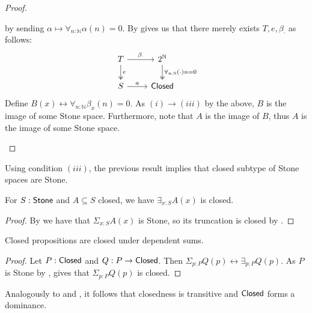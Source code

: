 \begin{proof}
\begin{itemize}
     by sending 
     $\alpha \mapsto \forall_{n:\mathbb N} \alpha (n) = 0.$
     By  gives us that there merely exists $T, e, \beta_\cdot$ as follows:
     \begin{equation}
       \begin{tikzcd}
         T \arrow[r,"\beta_\cdot"] \arrow[d, two heads,"e"] & 2^\mathbb N 
         \arrow[d,two heads, "\forall_{n:\mathbb N} (\cdot)n = 0"] \\
         S \arrow[r,"a"] & \Closed
       \end{tikzcd} 
     \end{equation} 
     Define $B(x) \leftrightarrow \forall_{n:\mathbb N} \beta_x(n) = 0$. 
     As $(i) \to (iii)$ by the above, $B$ is the image of some Stone space. 
     Furthermore, note that $A$ is the image of $B$, 
     thus $A$ is the image of some Stone space. 
\end{itemize} 
\end{proof} 

\begin{remark}\label{ClosedInStoneIsStone}
Using condition $(iii)$, the previous result implies that closed subtype of Stone spaces are Stone.
\end{remark}

\begin{corollary}\label{InhabitedClosedSubSpaceClosed}
  For $S:\mathsf{Stone}$ and $A\subseteq S$ closed, we have 
  $\exists_{x:S} A(x)$ is closed. 
\end{corollary}
\begin{proof}
  By  we have that $\Sigma_{x:S}A(x)$ is Stone, 
  so its truncation is closed by .
\end{proof}

\begin{corollary}\label{ClosedDependentSums}
  Closed propositions are closed under dependent sums. 
\end{corollary}
\begin{proof}
  Let $P:\mathsf{Closed}$ and $Q:P \to \mathsf{Closed}$. 
  Then $\Sigma_{p:P} Q(p) \leftrightarrow \exists_{p:P} Q(p)$.
  As $P$ is Stone by , 
   gives that $\Sigma_{p:P} Q(p)$ is closed. 
\end{proof}
\begin{remark}
  Analogously to  and , it follows that 
  closedness is transitive and $\mathsf{Closed}$ forms a dominance. 
\end{remark}

